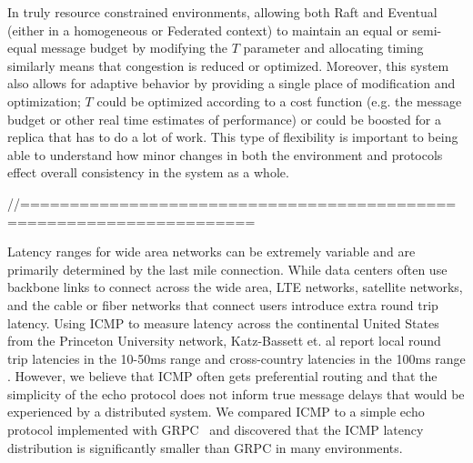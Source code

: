 In truly resource constrained environments, allowing both Raft and Eventual
(either in a homogeneous or Federated context) to maintain an equal or
semi-equal message budget by modifying the $T$ parameter and allocating timing
similarly means that congestion is reduced or optimized.
Moreover, this system also allows for adaptive behavior by providing a single
place of modification and optimization; $T$ could be optimized according to a
cost function (e.g.
the message budget or other real time estimates of performance) or could be
boosted for a replica that has to do a lot of work.
This type of flexibility is important to being able to understand how minor
changes in both the environment and protocols effect overall consistency in
the system as a whole.



//=====================================================================

Latency ranges for wide area networks can be extremely variable and are primarily
determined by the last mile connection.
While data centers often use backbone links to connect across the wide area, LTE networks,
satellite networks, and the cable or fiber networks that connect users introduce extra
round trip latency.
Using ICMP to measure latency across the continental United States from the Princeton
University network, Katz-Bassett et.
al report local round trip latencies in the 10-50ms range and cross-country latencies in
the 100ms range \cite{katz-bassett_towards_2006}.
However, we believe that ICMP often gets preferential routing and that the simplicity of
the echo protocol does not inform true message delays that would be experienced by a
distributed system.
We compared ICMP to a simple echo protocol implemented with GRPC~\cite{grpc} and discovered that the
ICMP latency distribution is significantly smaller than GRPC in many environments.

